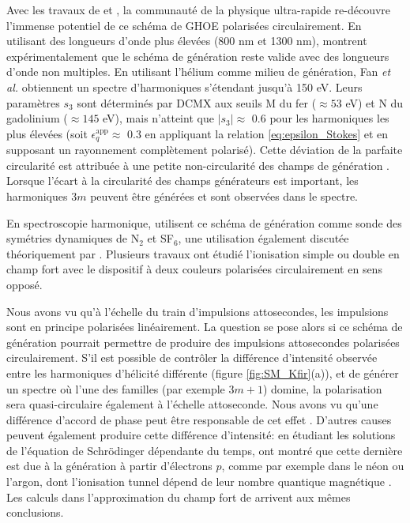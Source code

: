 Avec les travaux de  et , la communauté de la physique ultra-rapide re-découvre l'immense potentiel de ce schéma de GHOE polarisées circulairement. En utilisant des longueurs d'onde plus élevées (800 nm et 1300 nm),  montrent expérimentalement que le schéma de génération reste valide avec des longueurs d'onde non multiples. En utilisant l'hélium comme milieu de génération, Fan \textit{et al.} obtiennent un spectre d'harmoniques s'étendant jusqu'à 150 eV. Leurs paramètres $s_3$ sont déterminés par DCMX aux seuils M du fer ($\approx 53$ eV) et N du gadolinium ($\approx 145$ eV), mais n'atteint que $|s_3| \approx$ 0.6 pour les harmoniques les plus élevées (soit $\epsilon_{q}^{\text{app}} \approx$ 0.3 en appliquant la relation \ref{eq:epsilon_Stokes} et en supposant un rayonnement complètement polarisé). Cette déviation de la parfaite circularité est attribuée à une petite non-circularité des champs de génération . Lorsque l'écart à la circularité des champs générateurs est important, les harmoniques $3m$ peuvent être générées et sont observées dans le spectre.

En spectroscopie harmonique,  utilisent ce schéma de génération comme sonde des symétries dynamiques de N$_2$ et SF$_6$, une utilisation également discutée théoriquement par . Plusieurs travaux ont étudié l'ionisation simple  ou double  en champ fort avec le dispositif à deux couleurs polarisées circulairement en sens opposé.

Nous avons vu qu'à l'échelle du train d'impulsions attosecondes, les impulsions sont en principe polarisées linéairement. La question se pose alors si ce schéma de génération pourrait permettre de produire des impulsions attosecondes polarisées circulairement. S'il est possible de contrôler la différence d'intensité observée entre les harmoniques d'hélicité différente (figure \ref{fig:SM_Kfir}(a)), et de générer un spectre où l'une des familles (par exemple $3m+1$) domine, la polarisation sera quasi-circulaire également à l'échelle attoseconde. Nous avons vu qu'une différence d'accord de phase peut être responsable de cet effet . D'autres causes peuvent également produire cette différence d'intensité: en étudiant les solutions de l'équation de Schrödinger dépendante du temps,  ont montré que cette dernière est due à la génération à partir d'électrons $p$, comme par exemple dans le néon ou l'argon, dont l'ionisation tunnel dépend de leur nombre quantique magnétique . Les calculs dans l'approximation du champ fort de  arrivent aux mêmes conclusions.

